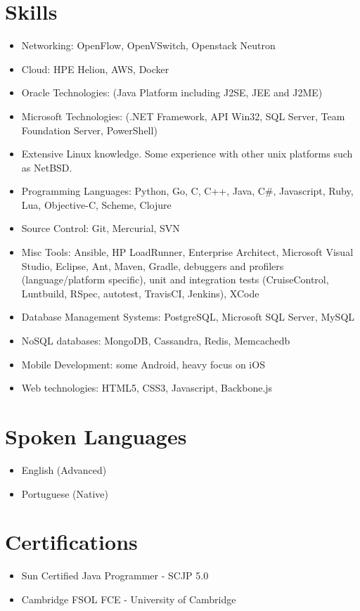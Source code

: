 \documentclass[letterpaper]{article}
\begin{document}
\section*{Skills}
\begin{itemize}
  \item Networking: OpenFlow, OpenVSwitch, Openstack Neutron
  \item Cloud: HPE Helion, AWS, Docker
  \item Oracle Technologies: (Java Platform including J2SE, JEE and J2ME)
  \item Microsoft Technologies: (.NET Framework, API Win32, SQL Server, Team Foundation Server, PowerShell)
  \item Extensive Linux knowledge. Some experience with other unix platforms such as NetBSD.
  \item Programming Languages: Python, Go, C, C++, Java, C\#, Javascript, Ruby, Lua, Objective-C, Scheme, Clojure
  \item Source Control: Git, Mercurial, SVN
  \item Misc Tools: Ansible, HP LoadRunner, Enterprise Architect, Microsoft Visual Studio, Eclipse, Ant, Maven, Gradle, debuggers and profilers (language/platform specific), unit and integration tests (CruiseControl, Luntbuild, RSpec, autotest, TravisCI, Jenkins), XCode
  \item Database Management Systems: PostgreSQL, Microsoft SQL Server, MySQL
  \item NoSQL databases: MongoDB, Cassandra, Redis, Memcachedb
  \item Mobile Development: some Android, heavy focus on iOS
  \item Web technologies: HTML5, CSS3, Javascript, Backbone.js
\end{itemize}

\section*{Spoken Languages}
\begin{itemize}
  \item English (Advanced)
  \item Portuguese (Native)
\end{itemize}

\section*{Certifications}
\begin{itemize}
  \item Sun Certified Java Programmer - SCJP 5.0
  \item Cambridge FSOL FCE - University of Cambridge
\end{itemize}
\end{document}
